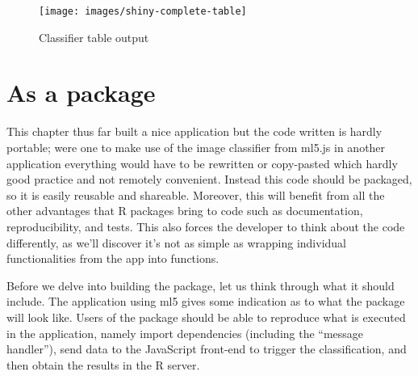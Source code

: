 \documentclass[
  10pt,
]{krantz}
\makeatletter
\newenvironment{Shaded}{\begin{snugshade}}{\end{snugshade}}
\newcommand{\KeywordTok}[1]{\textcolor[rgb]{0.27,0.27,0.27}{\textbf{#1}}}
\newcommand{\NormalTok}[1]{#1}
\newcommand{\OperatorTok}[1]{\textcolor[rgb]{0.43,0.43,0.43}{\textbf{#1}}}
\newcommand{\StringTok}[1]{\textcolor[rgb]{0.5,0.5,0.5}{#1}}
\newenvironment{kframe}{%
\medskip{}
\setlength{\fboxsep}{.8em}
 \def\at@end@of@kframe{}%
 \ifinner\ifhmode%
  \def\at@end@of@kframe{\end{minipage}}%
  \begin{minipage}{\columnwidth}%
 \fi\fi%
 \def\FrameCommand##1{\hskip\@totalleftmargin \hskip-\fboxsep
 \colorbox{shadecolor}{##1}\hskip-\fboxsep
     \hskip-\linewidth \hskip-\@totalleftmargin \hskip\columnwidth}%
 \MakeFramed {\advance\hsize-\width
   \@totalleftmargin\z@ \linewidth\hsize
   \@setminipage}}%
 {\par\unskip\endMakeFramed%
 \at@end@of@kframe}
\renewenvironment{Shaded}{\begin{kframe}}{\end{kframe}}
\makeatother
\begin{document}
\begin{Shaded}
\end{Shaded}

\begin{figure}[H]

{\centering \texttt{[image: images/shiny-complete-table]} 

}

\caption{Classifier table output}\label{fig:shiny-complete-table-output}
\end{figure}

\hypertarget{shiny-complete-pkg}{%
\section{As a package}\label{shiny-complete-pkg}}

This chapter thus far built a nice application but the code written is hardly portable; were one to make use of the image classifier from ml5.js in another application everything would have to be rewritten or copy-pasted which hardly good practice and not remotely convenient. Instead this code should be packaged, so it is easily reusable and shareable. Moreover, this will benefit from all the other advantages that R packages bring to code such as documentation, reproducibility, and tests. This also forces the developer to think about the code differently, as we'll discover it's not as simple as wrapping individual functionalities from the app into functions.

Before we delve into building the package, let us think through what it should include. The application using ml5 gives some indication as to what the package will look like. Users of the package should be able to reproduce what is executed in the application, namely import dependencies (including the ``message handler''), send data to the JavaScript front-end to trigger the classification, and then obtain the results in the R server.
\end{document}
